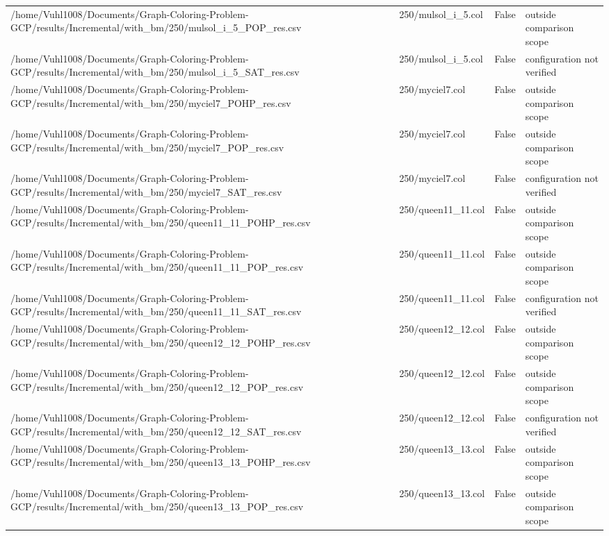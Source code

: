 \begin{table}[htbp]
\begin{tabular}{llll}
/home/Vuhl1008/Documents/Graph-Coloring-Problem-GCP/results/Incremental/with\_bm/250/mulsol\_i\_5\_POP\_res.csv & 250/mulsol\_i\_5.col & False & outside comparison scope \\
/home/Vuhl1008/Documents/Graph-Coloring-Problem-GCP/results/Incremental/with\_bm/250/mulsol\_i\_5\_SAT\_res.csv & 250/mulsol\_i\_5.col & False & configuration not verified \\
/home/Vuhl1008/Documents/Graph-Coloring-Problem-GCP/results/Incremental/with\_bm/250/myciel7\_POHP\_res.csv & 250/myciel7.col & False & outside comparison scope \\
/home/Vuhl1008/Documents/Graph-Coloring-Problem-GCP/results/Incremental/with\_bm/250/myciel7\_POP\_res.csv & 250/myciel7.col & False & outside comparison scope \\
/home/Vuhl1008/Documents/Graph-Coloring-Problem-GCP/results/Incremental/with\_bm/250/myciel7\_SAT\_res.csv & 250/myciel7.col & False & configuration not verified \\
/home/Vuhl1008/Documents/Graph-Coloring-Problem-GCP/results/Incremental/with\_bm/250/queen11\_11\_POHP\_res.csv & 250/queen11\_11.col & False & outside comparison scope \\
/home/Vuhl1008/Documents/Graph-Coloring-Problem-GCP/results/Incremental/with\_bm/250/queen11\_11\_POP\_res.csv & 250/queen11\_11.col & False & outside comparison scope \\
/home/Vuhl1008/Documents/Graph-Coloring-Problem-GCP/results/Incremental/with\_bm/250/queen11\_11\_SAT\_res.csv & 250/queen11\_11.col & False & configuration not verified \\
/home/Vuhl1008/Documents/Graph-Coloring-Problem-GCP/results/Incremental/with\_bm/250/queen12\_12\_POHP\_res.csv & 250/queen12\_12.col & False & outside comparison scope \\
/home/Vuhl1008/Documents/Graph-Coloring-Problem-GCP/results/Incremental/with\_bm/250/queen12\_12\_POP\_res.csv & 250/queen12\_12.col & False & outside comparison scope \\
/home/Vuhl1008/Documents/Graph-Coloring-Problem-GCP/results/Incremental/with\_bm/250/queen12\_12\_SAT\_res.csv & 250/queen12\_12.col & False & configuration not verified \\
/home/Vuhl1008/Documents/Graph-Coloring-Problem-GCP/results/Incremental/with\_bm/250/queen13\_13\_POHP\_res.csv & 250/queen13\_13.col & False & outside comparison scope \\
/home/Vuhl1008/Documents/Graph-Coloring-Problem-GCP/results/Incremental/with\_bm/250/queen13\_13\_POP\_res.csv & 250/queen13\_13.col & False & outside comparison scope \\

\end{tabular}
\end{table}
